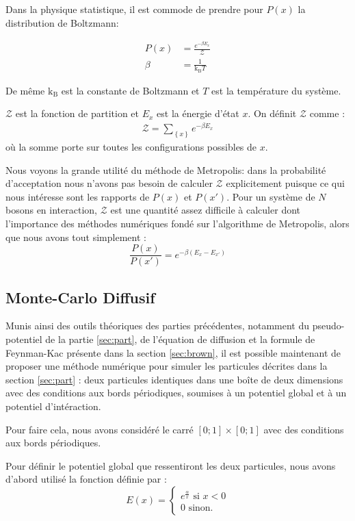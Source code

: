 \documentclass[11pt]{article}
\theoremstyle{definition}
\theoremstyle{remark}
\begin{document}
Dans la physique statistique, il est commode de prendre pour $P(x)$ la distribution de Boltzmann: 

\begin{align} 
\label{boltzmann_dist}
P(x) &= \frac{e^{-\beta E_x}}{\mathcal{Z}} \\
\beta &= \frac{1}{\mathrm{k_B}T}
\end{align}


De même $\mathrm{k_B}$ est la constante de Boltzmann et $T$ est la température du système. 

$\mathcal{Z}$ est la fonction de partition et $E_x$ est la énergie d'état $x$. 
On définit $\mathcal{Z}$ comme : 
\begin{align}
\label{partition}
\mathcal{Z}=\sum_{\left\lbrace x \right\rbrace} e^{-\beta E_x}
\end{align}
où la somme porte sur toutes les configurations possibles de $x$.

 Nous voyons la grande utilité du méthode de Metropolis: dans la probabilité d'acceptation nous n'avons pas besoin de calculer $\mathcal{Z}$ explicitement puisque ce qui nous intéresse sont les rapports de $P(x)$ et $P(x')$. Pour un système de $N$ bosons en interaction, $\mathcal{Z}$ est une quantité assez difficile à calculer dont l'importance des méthodes numériques fondé sur l'algorithme de Metropolis, alors que nous avons tout simplement :
\begin{equation}
 	\frac{P(x)}{P(x')}=e^{-\beta (E_x-E_{x'})}
\end{equation}
\subsection{Monte-Carlo Diffusif}
Munis ainsi des outils théoriques des parties précédentes, notamment du pseudo-potentiel de la partie \ref{sec:part}, de l'équation de diffusion et la formule de Feynman-Kac présente dans la section \ref{sec:brown}, il est possible maintenant de proposer une méthode numérique pour simuler les particules décrites dans la section \ref{sec:part} : deux particules identiques dans une boîte de deux dimensions avec des conditions aux bords périodiques, soumises à un potentiel global et à un potentiel d'intéraction.

Pour faire cela, nous avons considéré le carré $[0;1]\times[0;1]$ avec des conditions aux bords périodiques. 

Pour définir le potentiel global que ressentiront les deux particules, nous avons d'abord utilisé la fonction définie par :
\begin{equation}
\label{eq:eofx}
E(x)=\left\{\begin{matrix}
e^{\frac{\alpha}{x}} \mbox{ si }x<0\\
0 \mbox{ sinon.}

\end{matrix}\right.
\end{equation}
\end{document}
